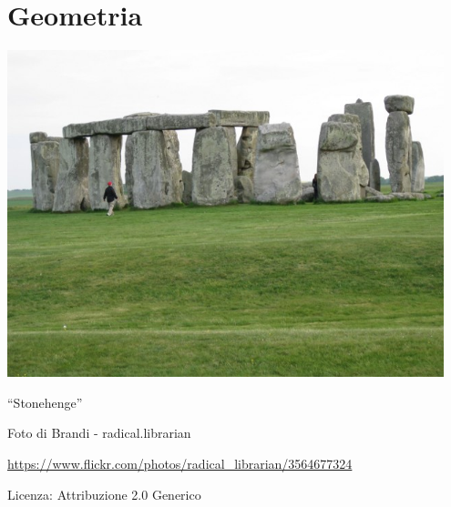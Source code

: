 \part{Geometria}

\includegraphics[width=0.95\textwidth]{img/stonehenge.jpg}
  \begin{center}
    {\large ``Stonehenge''}\par
    Foto di Brandi - radical.librarian\par
    \url{https://www.flickr.com/photos/radical_librarian/3564677324}\par
    Licenza: Attribuzione 2.0 Generico\par
  \end{center}
\clearpage
\cleardoublepage
